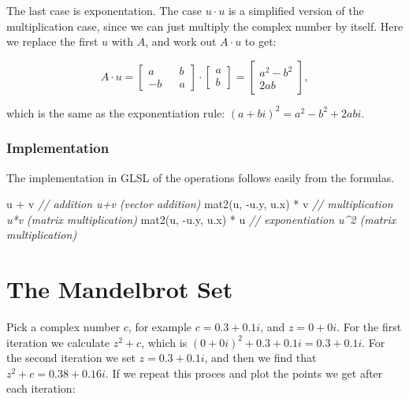 \documentclass[11pt]{article}
\newenvironment{Shaded}{}{}
\newcommand{\DataTypeTok}[1]{\textcolor[rgb]{0.56,0.13,0.00}{{#1}}}
\newcommand{\CommentTok}[1]{\textcolor[rgb]{0.38,0.63,0.69}{\textit{{#1}}}}
\newcommand{\FunctionTok}[1]{\textcolor[rgb]{0.02,0.16,0.49}{{#1}}}
\newcommand{\NormalTok}[1]{{#1}}
\begin{document}
The last case is exponentation. The case \(u\cdot u\) is a simplified
version of the multiplication case, since we can just multiply the
complex number by itself. Here we replace the first \(u\) with \(A\),
and work out \(A\cdot u\) to get:

\[ A\cdot u =  \begin{bmatrix} a && b \\ -b && a \end{bmatrix} \cdot \begin{bmatrix}a \\ b \end{bmatrix} = \begin{bmatrix} a^2-b^2 \\ 2ab \end{bmatrix},\]

which is the same as the exponentiation rule:
\((a + bi)^2 = a^2 - b^2 + 2abi\).

\hypertarget{implementation}{%
\subsubsection{Implementation}\label{implementation}}

The implementation in GLSL of the operations follows easily from the
formulas.

\begin{Shaded}
\begin{Highlighting}[]
\NormalTok{u + v                  }\CommentTok{// addition       u+v (vector addition)}
\DataTypeTok{mat2}\NormalTok{(u, -u.}\FunctionTok{y}\NormalTok{, u.}\FunctionTok{x}\NormalTok{) * v }\CommentTok{// multiplication u*v (matrix multiplication)}
\DataTypeTok{mat2}\NormalTok{(u, -u.}\FunctionTok{y}\NormalTok{, u.}\FunctionTok{x}\NormalTok{) * u }\CommentTok{// exponentiation u^2 (matrix multiplication)}
\end{Highlighting}
\end{Shaded}

    \hypertarget{the-mandelbrot-set}{%
\newpage
\section{The Mandelbrot Set}\label{the-mandelbrot-set}}

    Pick a complex number \(c\), for example \(c = 0.3 + 0.1i\), and
\(z = 0 + 0i\). For the first iteration we calculate \(z^2 + c\), which
is \((0 + 0i)^2 + 0.3 + 0.1i = 0.3 + 0.1i\). For the second iteration we
set \(z = 0.3+0.1i\), and then we find that \(z^2 + c = 0.38 + 0.16i\).
If we repeat this proces and plot the points we get after each
iteration:
\end{document}
